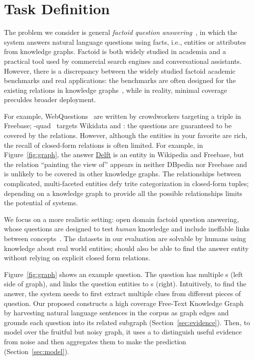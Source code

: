 \section{Task Definition}
\label{sec:justification}

The problem we consider is general \textit{factoid question
  answering}~\cite[inter alia]{iyyer2014neural, berant2013semantic, bordes2015large, 
  cai2013large}, in which the
system answers natural language questions using facts, i.e., entities
or attributes from knowledge graphs.
%
Factoid  is both widely studied in academia and a practical
tool used by commercial search engines and conversational assistants.
However, there is a discrepancy between the widely studied factoid
 academic benchmarks and  real applications:
the benchmarks are often designed for the existing relations in
knowledge graphs~\cite{berant2013semantic,bordes2015large}, while in reality,
minimal  coverage preculdes broader deployment.

For example, WebQuestions~\cite{berant2013semantic} are
written by crowdworkers targeting a triple in Freebase; -quad~\cite{dubey2019lc} targets Wikidata and \dbpedia{}: the
questions are guaranteed to be covered by the  relations.
%
However, although the entities in your favorite
 are rich, the recall of closed-form relations is often
limited.
%
For example, in Figure~\ref{fig:graph}, the answer \underline{Delft}
is an entity in Wikipedia and Freebase, but the relation ``painting
the view of'' appears in neither DBpedia nor Freebase and is unlikely
to be covered in other knowledge graphs.
%
The relationships between complicated, multi-faceted entities defy
trite categorization in closed-form tuples; depending on a knowledge
graph to provide all the possible relationships limits the potential
of  systems.

We focus on a more realistic setting: open domain factoid
question answering, whose questions are designed to test \emph{human}
knowledge and include ineffable links between concepts~\cite{jennings-06}.
%
The datasets in our evaluation are solvable by humans using knowledge
about real world entities; \name{} should also be able to find the
answer entity without relying on explicit closed form relations.

Figure~\ref{fig:graph} shows an example question. 
The question has multiple \leftnode{}s (left side of graph), 
and links the question entities to \rightnode{}s (right). 
Intuitively, to find the answer, the system needs to first extract
multiple clues from different pieces of question.
%
Our proposed \name{} constructs a high coverage Free-Text Knowledge
Graph by harvesting natural language sentences in the corpus as graph
edges and grounds each question into its related subgraph
(Section~\ref{sec:evidence}).
%
Then, to model over the fruitful but noisy graph, it uses a 
to distinguish useful evidence from noise and then aggregates them to
make the prediction (Section~\ref{sec:model}).

